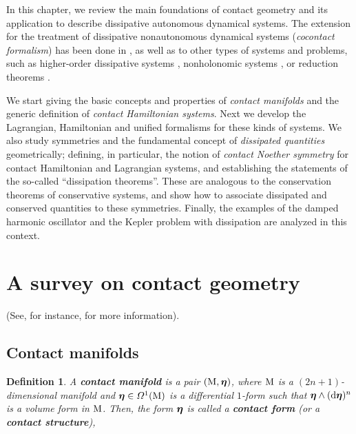 \documentclass[12pt]{report}
\newtheorem{definition}[teor]{Definition}
\def\df{{\mit\Omega}}
\def\d{{\rm d}}
\def\bmeta{\mbox{\boldmath $\eta$}}
\begin{document}
In this chapter, we review the main foundations of contact geometry 
and its application to describe dissipative autonomous dynamical systems.
The extension for the treatment of dissipative nonautonomous dynamical systems ({\sl cocontact formalism\/}) has been done in
\cite{LGGMR-2023,DeLeon2016b,RiTo-2022},
as well as to other types of systems and problems, such as 
higher-order dissipative systems \cite{LGLMR-2021},
nonholonomic systems \cite{LJL-2021,LLMR-2021}, or reduction theorems \cite{GG-2023,Wi-2002}.

We start giving the basic concepts and properties of {\sl contact manifolds} and the generic definition of {\sl contact Hamiltonian systems}. 
Next we develop the Lagrangian, Hamiltonian and unified formalisms for these kinds of systems.
We also study symmetries and the fundamental concept of {\sl dissipated quantities} geometrically;
defining, in particular, the notion of
{\sl contact Noether symmetry} for contact Hamiltonian and Lagrangian systems,
and establishing the statements of the so-called ``dissipation theorems''. 
These are analogous to the conservation theorems of conservative systems,
and show how to associate dissipated and conserved quantities to these symmetries.
Finally, the examples of the damped harmonic oscillator and the Kepler problem with dissipation
are analyzed in this context.


\section{A survey on contact geometry}
\label{scg}


(See, for instance, \cite{ABKLR-2012,
BHD-2016,Bravetti-2019,dN-2013,CIAGLIA2018,GGMRR-2019b,KA-2013,LM-sgam}
for more information).


\subsection{Contact manifolds}

   
\begin{definition}
\label{definition-contact-manifold}
A {\sl \textbf{contact manifold}} is a pair $({\rm M},\bmeta)$,
where ${\rm M}$ is a $(2n+1)$-dimensional manifold and
$\bmeta\in\df^1({\rm M})$ is a differential $1$-form
such that $\bmeta\wedge(\d\bmeta)^n$ is a volume form in ${\rm M}$.
Then, the form $\bmeta$ is called a {\sl \textbf{contact form}}
(or a {\sl \textbf{contact structure}}\/),
\end{definition}
\end{document}
